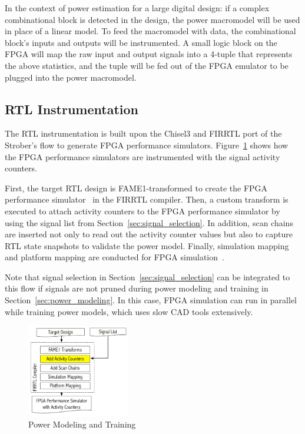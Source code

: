 In the context of power estimation for a large digital design: if a complex combinational block is detected in the design, the power macromodel will be used in place of a linear model. To feed the macromodel with data, the combinational block's inputs and outputs will be instrumented. A small logic block on the FPGA will map the raw input and output signals into a 4-tuple that represents the above statistics, and the tuple will be fed out of the FPGA emulator to be plugged into the power macromodel.

\subsection{RTL Instrumentation}
\label{sec:instrumentation}
The RTL instrumentation is built upon the Chisel3 and FIRRTL port of the Strober's flow
to generate FPGA performance simulators. Figure~\ref{fig:power_modeling} shows how
the FPGA performance simulators are instrumented with the signal activity counters.

First, the target RTL design is FAME1-transformed to create the FPGA performance simulator~\cite{Kim2016}
in the FIRRTL compiler. Then, a custom transform is executed to attach activity counters
to the FPGA performance simulator by using the signal list from Section~\ref{sec:signal_selection}.
In addition, scan chains are inserted not only to read out the activity counter values but also to
capture RTL state snapshots to validate the power model. Finally, simulation mapping and platform mapping
are conducted for FPGA simulation~\cite{Kim2016}.

Note that signal selection in Section~\ref{sec:signal_selection} can be integrated to
this flow if signals are not pruned during power modeling and training in
Section~\ref{sec:power_modeling}. In this case, FPGA simulation can run in parallel while
training power models, which uses slow CAD tools extensively.

\begin{figure}[!ht]
	\centering
	\includegraphics[width=0.4\textwidth,height=\textheight,keepaspectratio]{images/instrumentation.pdf}
	\caption{Power Modeling and Training}
	\label{fig:power_modeling}
\end{figure}

